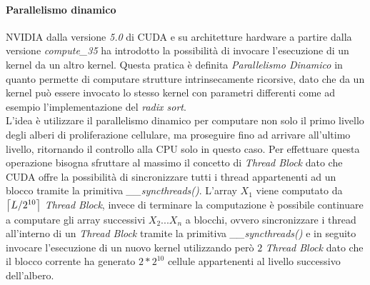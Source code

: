 \paragraph{Parallelismo dinamico}

NVIDIA dalla versione \textit{5.0} di CUDA e su architetture hardware a partire
dalla versione \textit{compute\_35} ha introdotto la possibilità di invocare
l'esecuzione di un kernel da un altro kernel.
Questa pratica è definita
\textit{Parallelismo Dinamico}\cite{jones2012introduction} in quanto permette
di computare strutture intrinsecamente ricorsive, dato che da un kernel può
essere invocato lo stesso kernel con parametri differenti come ad 
esempio l'implementazione del \textit{radix sort}\cite{merrill2011high}.
\\
L'idea è utilizzare il parallelismo dinamico per computare non solo il primo
livello degli alberi di proliferazione cellulare, ma proseguire fino ad arrivare
all'ultimo livello, ritornando il controllo alla CPU solo in questo caso.
Per effettuare questa operazione bisogna sfruttare al massimo il concetto di
\textit{Thread Block} dato che CUDA offre la possibilità di sincronizzare
tutti i thread appartenenti ad un blocco tramite la primitiva
\textit{\_\_syncthreads()}\cite{jones2012introduction}.
L'array $X_{1}$ viene computato da $\ceil*{L/2^{10}}$ \textit{Thread Block},
invece di terminare la computazione è possibile continuare a computare
gli array successivi $X_{2}...X_{n}$ a blocchi, ovvero sincronizzare i thread
all'interno di un \textit{Thread Block} tramite la primitiva
\textit{\_\_syncthreads()} e in seguito invocare l'esecuzione di un nuovo kernel
utilizzando però $2$ \textit{Thread Block} dato che il blocco corrente ha
generato $2 * 2^{10}$ cellule appartenenti al livello successivo dell'albero.
\\
